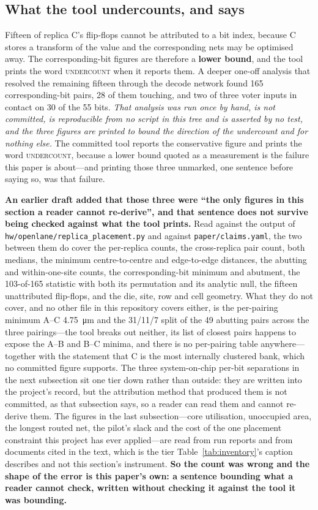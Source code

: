 \documentclass[11pt,a4paper]{article}
\newcommand{\file}[1]{\texttt{\small #1}}
\begin{document}
\subsection{What the tool undercounts, and says}

Fifteen of replica C's flip-flops cannot be attributed to a bit index,
because C stores a transform of the value and the corresponding nets may
be optimised away. The corresponding-bit figures are therefore a
\textbf{lower bound}, and the tool prints the word \textsc{undercount}
when it reports them. A deeper one-off analysis that resolved the
remaining fifteen through the decode network found 165 corresponding-bit
pairs, 28 of them touching, and two of three voter inputs in contact on
30 of the 55 bits. \emph{That analysis was run once by hand, is not
committed, is reproducible from no script in this tree and is asserted
by no test, and the three figures are printed to bound the direction of
the undercount and for nothing else.} The committed tool reports the
conservative figure and prints the word \textsc{undercount}, because a
lower bound quoted as a measurement is the failure this paper is
about---and printing those three unmarked, one sentence before saying
so, was that failure.

\textbf{An earlier draft added that those three were ``the only figures
in this section a reader cannot re-derive'', and that sentence does not
survive being checked against what the tool prints.} Read against the
output of \file{hw/openlane/replica\_placement.py} and against
\file{paper/claims.yaml}, the two between them do cover the per-replica
counts, the cross-replica pair count, both medians, the minimum
centre-to-centre and edge-to-edge distances, the abutting and
within-one-site counts, the corresponding-bit minimum and abutment, the
103-of-165 statistic with both its permutation and its analytic null,
the fifteen unattributed flip-flops, and the die, site, row and cell
geometry. What they do not cover, and no other file in this repository
covers either, is the per-pairing minimum A--C \SI{4.75}{\micro\meter}
and the 31/11/7 split of the 49 abutting pairs across the three
pairings---the tool breaks out neither, its list of closest pairs
happens to expose the A--B and B--C minima, and there is no per-pairing
table anywhere---together with the statement that C is the most
internally clustered bank, which no committed figure supports. The three
system-on-chip per-bit separations in the next subsection sit one tier
down rather than outside: they are written into the project's record,
but the attribution method that produced them is not committed, as that
subsection says, so a reader can read them and cannot re-derive them.
The figures in the last
subsection---core utilisation, unoccupied area, the longest routed net,
the pilot's slack and the cost of the one placement constraint this
project has ever applied---are read from run reports and from documents
cited in the text, which is the tier
Table~\ref{tab:inventory}'s caption describes and not this section's
instrument. \textbf{So the count was wrong and the shape of the error is
this paper's own: a sentence bounding what a reader cannot check,
written without checking it against the tool it was bounding.}
\end{document}

